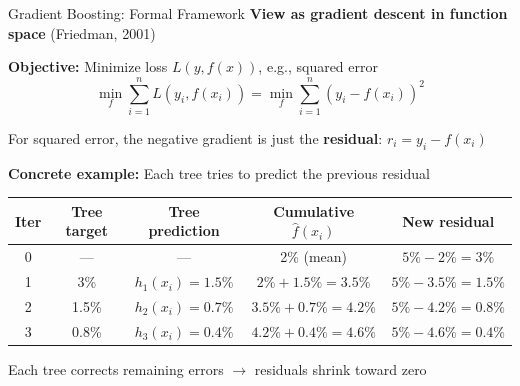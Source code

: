 \documentclass[10pt]{beamer}
\newcommand{\highlight}[1]{\textcolor{AccentOrange}{\textbf{#1}}}
\begin{document}
\begin{frame}{Gradient Boosting: Formal Framework}
  \textbf{View as gradient descent in function space} (Friedman, 2001)

  \vspace{0.3em}
  \textbf{Objective:} Minimize loss $L(y, f(x))$, e.g., squared error
  \[
  \min_f \sum_{i=1}^{n} L(y_i, f(x_i)) = \min_f \sum_{i=1}^{n} (y_i - f(x_i))^2
  \]

  \vspace{0.3em}
  For squared error, the negative gradient is just the \highlight{residual}: $r_i = y_i - f(x_i)$

  \vspace{0.5em}
  \textbf{Concrete example:} Each tree tries to predict the previous residual

  \vspace{0.3em}
  \begin{center}
  \footnotesize
  \begin{tabular}{ccccc}
    \toprule
    \textbf{Iter} & \textbf{Tree target} & \textbf{Tree prediction} & \textbf{Cumulative $\widehat{f}(x_i)$} & \textbf{New residual} \\
    \midrule
    0 & --- & --- & 2\% (mean) & $5\% - 2\% = 3\%$ \\
    1 & 3\% & $h_1(x_i) = 1.5\%$ & $2\% + 1.5\% = 3.5\%$ & $5\% - 3.5\% = 1.5\%$ \\
    2 & 1.5\% & $h_2(x_i) = 0.7\%$ & $3.5\% + 0.7\% = 4.2\%$ & $5\% - 4.2\% = 0.8\%$ \\
    3 & 0.8\% & $h_3(x_i) = 0.4\%$ & $4.2\% + 0.4\% = 4.6\%$ & $5\% - 4.6\% = 0.4\%$ \\
    \bottomrule
  \end{tabular}
  \end{center}

  \vspace{0.3em}
  Each tree corrects remaining errors $\rightarrow$ residuals shrink toward zero
\end{frame}

\end{document}
